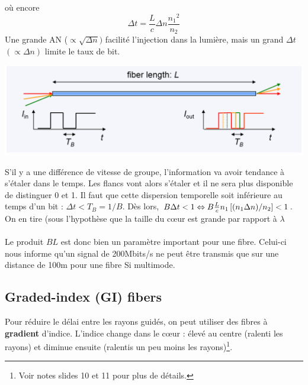 où encore
\begin{equation}
\Delta t = \frac{L}{c}\Delta n\frac{{{n_1}^2}}{{{n_2}}}
\end{equation}
Une grande AN ($\propto \sqrt{\Delta n})$ facilité l'injection dans la lumière, mais un grand $\Delta t$ $(\propto\Delta n)$ limite le taux de bit.

\begin{center}
	\includegraphics[scale=0.4]{ch1/image6}
\end{center}

S'il y a une différence de vitesse de groupe, l'information va avoir tendance à s'étaler dans le 
temps. Les flancs vont alors s'étaler et il ne sera plus disponible de distinguer 0 et 1. Il faut que
cette dispersion temporelle soit inférieure au temps d'un bit : $\Delta t < T_B = 1/B$. Dès lors, 
$B\Delta t < 1 \Leftrightarrow B\frac{L}{c}{n_1}\left[ {{{\left( {{n_1}\Delta n} \right)} \mathord{\left/
 {\vphantom {{\left( {{n_1}\Delta n} \right)} {{n_2}}}} \right.
 \kern-\nulldelimiterspace} {{n_2}}}} \right] < 1$. On en tire (sous l'hypothèse que la taille du 
 cœur est grande par rapport à $\lambda$\\
 
 \ \\
 
Le produit $BL$ est donc bien un paramètre important pour une fibre. Celui-ci nous informe qu'un
signal de 200Mbits/s ne peut être transmis que sur une distance de 100m pour une fibre Si multimode. 

\newpage
\subsection{Graded-index (GI) fibers}
Pour réduire le délai entre les rayons guidés, on peut utiliser des fibres à \textbf{gradient} 
d'indice. L'indice change dans le cœur : élevé au centre (ralenti les rayons) et diminue ensuite 
(ralentis un peu moins les rayons)\footnote{Voir notes slides 10 et 11 pour plus de détails.}. 

